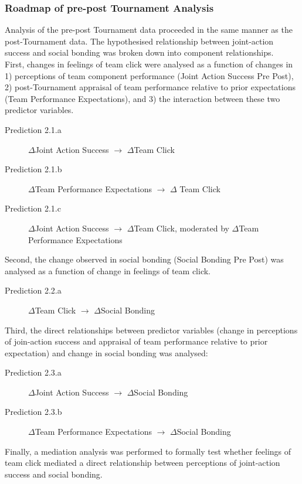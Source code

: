 \subsubsection{Roadmap of pre-post Tournament Analysis}
Analysis of the pre-post Tournament data proceeded in the same manner as the post-Tournament data. The hypothesised relationship between joint-action success and social bonding was broken down into component relationships. \\

First, changes in feelings of team click were analysed as a function of changes in 1) perceptions of team component performance (Joint Action Success Pre Post), 2) post-Tournament appraisal of team performance relative to prior expectations (Team Performance Expectations), and 3) the interaction between these two predictor variables.
\bigskip
\begin{description}
  \item [Prediction 2.1.a] $\Delta$Joint Action Success  $\rightarrow$  $\Delta$Team Click
  \item [Prediction 2.1.b] $\Delta$Team Performance Expectations $\rightarrow$ $\Delta$ Team Click
  \item [Prediction 2.1.c] $\Delta$Joint Action Success $\rightarrow$ $\Delta$Team Click, moderated by $\Delta$Team Performance Expectations
\end{description}

Second, the change observed in social bonding (Social Bonding Pre Post) was analysed as a function of change in feelings of team click.
\bigskip
\begin{description}
  \item [Prediction 2.2.a] $\Delta$Team Click $\rightarrow$ $\Delta$Social Bonding
\end{description}

Third, the direct relationships between predictor variables (change in perceptions of join-action success and appraisal of team performance relative to prior expectation) and change in social bonding was analysed:
\bigskip
\begin{description}
  \item [Prediction 2.3.a] $\Delta$Joint Action Success $\rightarrow$ $\Delta$Social Bonding
  \item [Prediction 2.3.b] $\Delta$Team Performance Expectations $\rightarrow$ $\Delta$Social Bonding
\end{description}

Finally, a mediation analysis was performed to formally test whether feelings of team click mediated a direct relationship between perceptions of joint-action success and social bonding.

